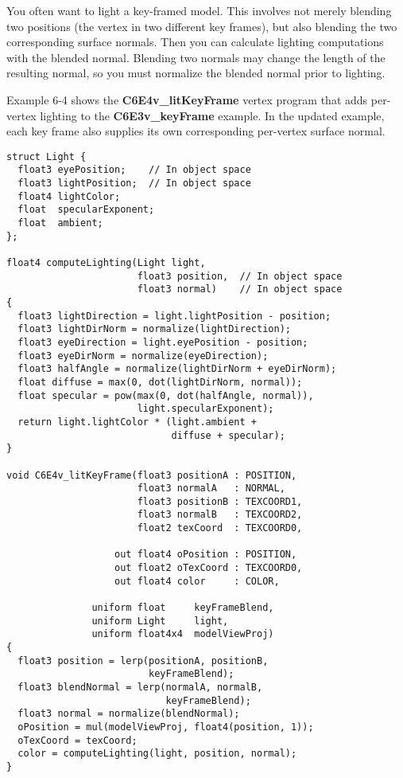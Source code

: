\documentclass[../main.tex]{subfiles}
\begin{document}
You often want to light a key-framed model. This involves not merely blending two positions (the vertex in two different key frames), but also blending the two corresponding surface normals. Then you can calculate lighting computations with the blended normal. Blending two normals may change the length of the resulting normal, so you must normalize the blended normal prior to lighting.

Example 6-4 shows the \textbf{C6E4v_litKeyFrame} vertex program that adds per-vertex lighting to the \textbf{C6E3v_keyFrame} example. In the updated example, each key frame also supplies its own corresponding per-vertex surface normal.

\FloatBarrier
\begin{lstlisting}[caption=Example 6-4. The \textbf{C6E4v_litKeyFrame} Vertex Program]
struct Light {
  float3 eyePosition;    // In object space
  float3 lightPosition;  // In object space
  float4 lightColor;
  float  specularExponent;
  float  ambient;
};

float4 computeLighting(Light light,
                       float3 position,  // In object space
                       float3 normal)    // In object space
{
  float3 lightDirection = light.lightPosition - position;
  float3 lightDirNorm = normalize(lightDirection);
  float3 eyeDirection = light.eyePosition - position;
  float3 eyeDirNorm = normalize(eyeDirection);
  float3 halfAngle = normalize(lightDirNorm + eyeDirNorm);
  float diffuse = max(0, dot(lightDirNorm, normal));
  float specular = pow(max(0, dot(halfAngle, normal)),
                       light.specularExponent);
  return light.lightColor * (light.ambient +
                             diffuse + specular);
}

void C6E4v_litKeyFrame(float3 positionA : POSITION,
                       float3 normalA   : NORMAL,
                       float3 positionB : TEXCOORD1,
                       float3 normalB   : TEXCOORD2,
                       float2 texCoord  : TEXCOORD0,

                   out float4 oPosition : POSITION,
                   out float2 oTexCoord : TEXCOORD0,
                   out float4 color     : COLOR,

               uniform float     keyFrameBlend,
               uniform Light     light,
               uniform float4x4  modelViewProj)
{
  float3 position = lerp(positionA, positionB,
                         keyFrameBlend);
  float3 blendNormal = lerp(normalA, normalB,
                            keyFrameBlend);
  float3 normal = normalize(blendNormal);
  oPosition = mul(modelViewProj, float4(position, 1));
  oTexCoord = texCoord;
  color = computeLighting(light, position, normal);
}
\end{lstlisting}
\FloatBarrier
\end{document}
